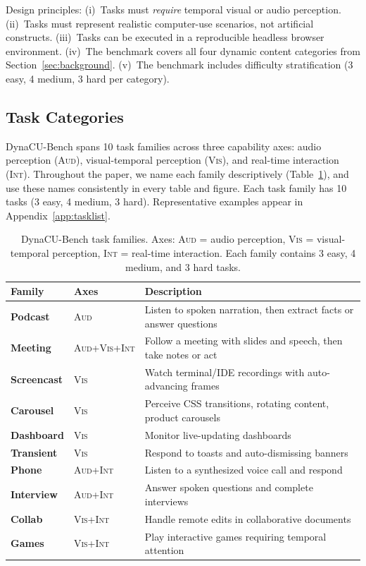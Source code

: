 \documentclass[11pt]{article}
\begin{document}
Design principles:
(i)~Tasks must \emph{require} temporal visual or audio perception.
(ii)~Tasks must represent realistic computer-use scenarios, not artificial constructs.
(iii)~Tasks can be executed in a reproducible headless browser environment.
(iv)~The benchmark covers all four dynamic content categories from Section~\ref{sec:background}.
(v)~The benchmark includes difficulty stratification (3 easy, 4 medium, 3 hard per category).

\subsection{Task Categories}

DynaCU-Bench spans 10 task families across three capability axes: audio
perception (\textsc{Aud}), visual-temporal perception (\textsc{Vis}), and
real-time interaction (\textsc{Int}).
Throughout the paper, we name each family descriptively (Table~\ref{tab:categories}), and use these names consistently in every table and figure.
Each task family has 10 tasks (3 easy, 4 medium, 3 hard). Representative examples
appear in Appendix~\ref{app:tasklist}.

\begin{table}[ht!]
\centering
\caption{DynaCU-Bench task families.
Axes: \textsc{Aud} = audio perception, \textsc{Vis} = visual-temporal
perception, \textsc{Int} = real-time interaction.
Each family contains 3 easy, 4 medium, and 3 hard tasks.}
\label{tab:categories}
\small
\begin{tabular}{@{}llp{7.0cm}@{}}
\toprule
\textbf{Family} & \textbf{Axes} & \textbf{Description} \\
\midrule
\textbf{Podcast}   & \textsc{Aud}             & Listen to spoken narration, then extract facts or answer questions \\
\textbf{Meeting}   & \textsc{Aud+Vis+Int}     & Follow a meeting with slides and speech, then take notes or act \\
\textbf{Screencast}& \textsc{Vis}             & Watch terminal/IDE recordings with auto-advancing frames \\
\textbf{Carousel}  & \textsc{Vis}             & Perceive CSS transitions, rotating content, product carousels \\
\textbf{Dashboard} & \textsc{Vis}             & Monitor live-updating dashboards \\
\textbf{Transient} & \textsc{Vis}             & Respond to toasts and auto-dismissing banners \\
\textbf{Phone}     & \textsc{Aud+Int}         & Listen to a synthesized voice call and respond \\
\textbf{Interview} & \textsc{Aud+Int}         & Answer spoken questions and complete interviews \\
\textbf{Collab}    & \textsc{Vis+Int}         & Handle remote edits in collaborative documents \\
\textbf{Games}     & \textsc{Vis+Int}         & Play interactive games requiring temporal attention \\
\bottomrule
\end{tabular}
\end{table}
\end{document}
